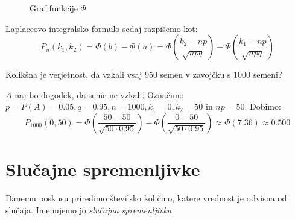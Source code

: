 \documentclass[12pt]{book}
\theoremstyle{definition}
\theoremstyle{plain}
\theoremstyle{plain}
\theoremstyle{plain}
\theoremstyle{remark}
\begin{document}
\begin{enumerate}[label=(\alph*)]
    \begin{figure}[H]
        \centering

        \caption{Graf funkcije $\Phi$}
        \label{fig:7}
    \end{figure}

    Laplaceovo integralsko formulo sedaj razpišemo kot:
    $$
    P_n\left(k_1, k_2\right)=\Phi(b)-\Phi(a)=\Phi\left(\frac{k_2-n p}{\sqrt{n p q}}\right)-\Phi\left(\frac{k_1-n p}{\sqrt{n p q}}\right)
    $$
    \begin{zgled}
        Kolikšna je verjetnost, da vzkali vsaj $950$ semen v zavojčku s $1000$ semeni?

        $A$ naj bo dogodek, da seme ne vzkali. Označimo $p=P(A)=0.05, q=0.95, n=1000, k_1 = 0, k_2 = 50$ in $n p=50$. Dobimo:
        $$
        P_{1000}(0,50)=\Phi\left(\frac{50-50}{\sqrt{50 \cdot 0.95}}\right)-\Phi\left(\frac{0-50}{\sqrt{50 \cdot 0.95}}\right)\approx \Phi(7.36) \approx 0.500
        $$
    \end{zgled}
\end{enumerate}

\chapter{Slučajne spremenljivke}

Danemu poskusu priredimo številsko količino, katere vrednost je odvisna od slučaja. Imenujemo jo \emph{slučajna spremenljivka.}
\end{document}
